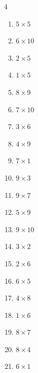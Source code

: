 \begin{multicols}{4}
\begin{enumerate}
  \item $5\times 5$
        \phantom{$=25$}

  \item $6\times 10$
        \phantom{$=60$}

  \item $2\times 5$
        \phantom{$=10$}

  \item $1\times 5$
        \phantom{$=5$}

  \item $8\times 9$
        \phantom{$=72$}

  \item $7\times 10$
        \phantom{$=70$}

  \item $3\times 6$
        \phantom{$=18$}

  \item $4\times 9$
        \phantom{$=36$}

  \item $7\times 1$
        \phantom{$=7$}

  \item $9\times 3$
        \phantom{$=27$}

  \item $9\times 7$
        \phantom{$=63$}

  \item $5\times 9$
        \phantom{$=45$}

  \item $9\times 10$
        \phantom{$=90$}

  \item $3\times 2$
        \phantom{$=6$}

  \item $2\times 6$
        \phantom{$=12$}

  \item $6\times 5$
        \phantom{$=30$}

  \item $4\times 8$
        \phantom{$=32$}

  \item $1\times 6$
        \phantom{$=6$}

  \item $8\times 7$
        \phantom{$=56$}

  \item $8\times 4$
        \phantom{$=32$}

  \item $6\times 1$
        \phantom{$=6$}


\end{enumerate}
\end{multicols}
